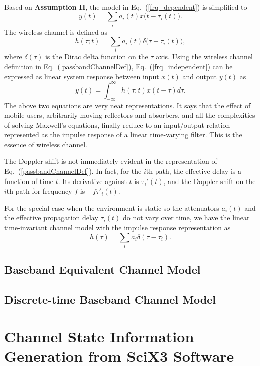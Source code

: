 \documentclass[letterpaper,11pt]{article}
\begin{document}

~~\\

Based on {\textbf{Assumption II}}, the model in Eq.~(\ref{frq_dependent}) is simplified to
\begin{equation}\label{frq_independent}
y(t)=\displaystyle\sum_i a_i(t)x\big(t-\tau_i(t)\big).
\end{equation}
The wireless channel is defined as
\begin{equation}\label{passbandChannelDef}
\boxed{h(\tau;t)=\displaystyle\sum_ia_i(t)\delta\bigg(\tau-\tau_i(t)\bigg),}
\end{equation}
where $\delta(\tau)$ is the Dirac delta function on the $\tau$ axis. Using the wireless channel definition in Eq.~{(\ref{passbandChannelDef}}), Eq.~(\ref{frq_independent}) can be expressed as linear system response between input $x(t)$ and output $y(t)$ as
\begin{equation}
y(t)=\displaystyle\int_{-\infty}^{\infty}h(\tau;t)x(t-\tau)d\tau.
\end{equation}
The above two equations are very neat representations. It says that the effect of mobile users, arbitrarily moving reflectors and absorbers, and all the complexities of solving Maxwell's equations, finally reduce to an input/output relation represented as the impulse response of a linear time-varying filter. This is the essence of wireless channel.

The Doppler shift is not immediately evident in the representation of Eq.~(\ref{passbandChannelDef}). In fact, for the $i$th path, the effective delay is a function of time $t$. Its derivative against $t$ is $\tau_i'(t)$, and the Doppler shift on the $i$th path for frequency $f$ is $-f\tau'_i(t)$. 

For the special case when the environment is static so the attenuators $a_i(t)$ and the effective propagation delay $\tau_i(t)$ do not vary over time, we have the linear time-invariant channel model with the impulse response representation as
\begin{equation}
h(\tau)=\displaystyle\sum_ia_i\delta(\tau-\tau_i).
\end{equation}



\subsection{Baseband Equivalent Channel Model}

\subsection{Discrete-time Baseband Channel Model}

\section{Channel State Information Generation from SciX3 Software}



\end{document}
